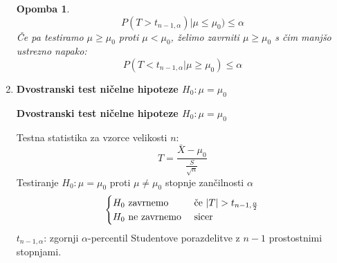 \documentclass[11pt]{article}
\newtheorem{Opomba}[Izrek]{{\sc Opomba}}
\begin{document}
\begin{enumerate}
\begin{Opomba}
 	$$P(T > t_{n-1,\alpha} )| \mu \le \mu_0) \le \alpha$$
 	Če pa testiramo $\mu \ge \mu_0$ proti $\mu < \mu_0$, želimo zavrniti $\mu \ge \mu_0$ s čim manjšo ustrezno napako:
 	$$P(T< t_{n-1,\alpha} | \mu \ge \mu_0) \le \alpha$$
 \end{Opomba}
	\item
	\textbf{Dvostranski test ničelne hipoteze $H_0: \mu =\mu_0$}
	\begin{framed}
		\begin{center}
			\textbf{Dvostranski test ničelne hipoteze $H_0: \mu =\mu_0$}
		\end{center}
		Testna statistika za vzorce velikosti $n$:
		$$T = \frac{\bar{X} - \mu_0}{\frac{S}{\sqrt{n}}}$$
		Testiranje $H_0: \mu = \mu_0$ proti $\mu \ne \mu_0$ stopnje zančilnosti $\alpha$
		\[
		\begin{cases}
		H_0 \textnormal{ zavrnemo } & \textnormal{če } |T| > t_{n-1,\frac{\alpha}{2}}\\
		H_0 \textnormal{ ne zavrnemo } & \textnormal{sicer}
		\end{cases}
		\]
		$t_{n-1,\alpha}$: zgornji $\alpha$-percentil Studentove porazdelitve z $n-1$ prostostnimi stopnjami.
	\end{framed}
	\end{enumerate}
\end{document}
